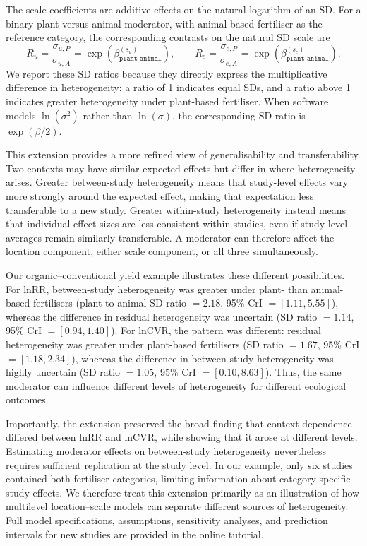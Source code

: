\begin{tcolorbox}[
  breakable,
  enhanced,
  colback=white,
  colframe=black,
  boxrule=0.7pt,
  arc=0pt,
  left=10pt,
  right=10pt,
  top=8pt,
  bottom=8pt,
  before skip=12pt,
  after skip=12pt
]
The scale coefficients are additive effects on the natural logarithm of an SD.
For a binary plant-versus-animal moderator, with animal-based fertiliser as the
reference category, the corresponding contrasts on the natural SD scale are
\[
  R_u=\frac{\sigma_{u,P}}{\sigma_{u,A}}
      =\exp\!\left(\beta_{\texttt{plant-animal}}^{(s_u)}\right),
  \qquad
  R_e=\frac{\sigma_{e,P}}{\sigma_{e,A}}
      =\exp\!\left(\beta_{\texttt{plant-animal}}^{(s_e)}\right).
\]
We report these SD ratios because they directly express the multiplicative
difference in heterogeneity: a ratio of 1 indicates equal SDs, and a ratio above
1 indicates greater heterogeneity under plant-based fertiliser. When software
models $\ln(\sigma^2)$ rather than $\ln(\sigma)$, the corresponding SD ratio is
$\exp(\beta/2)$.

This extension provides a more refined view of generalisability and
transferability. Two contexts may have similar expected effects but differ in
where heterogeneity arises. Greater between-study heterogeneity means that
study-level effects vary more strongly around the expected effect, making that
expectation less transferable to a new study. Greater within-study
heterogeneity instead means that individual effect sizes are less consistent
within studies, even if study-level averages remain similarly transferable. A
moderator can therefore affect the location component, either scale component,
or all three simultaneously.

Our organic--conventional yield example illustrates these different
possibilities. For lnRR, between-study heterogeneity was greater under plant-
than animal-based fertilisers (plant-to-animal SD ratio $=2.18$, 95\% CrI
$=[1.11, 5.55]$), whereas the difference in residual heterogeneity was
uncertain (SD ratio $=1.14$, 95\% CrI $=[0.94, 1.40]$). For lnCVR, the pattern
was different: residual heterogeneity was greater under plant-based fertilisers
(SD ratio $=1.67$, 95\% CrI $=[1.18, 2.34]$), whereas the difference in
between-study heterogeneity was highly uncertain (SD ratio $=1.05$, 95\% CrI
$=[0.10, 8.63]$). Thus, the same moderator can influence different levels of
heterogeneity for different ecological outcomes.

Importantly, the extension preserved the broad finding that context dependence
differed between lnRR and lnCVR, while showing that it arose at different
levels. Estimating moderator effects on between-study heterogeneity nevertheless
requires sufficient replication at the study level. In our example, only six
studies contained both fertiliser categories, limiting information about
category-specific study effects. We therefore treat this extension primarily
as an illustration of how multilevel location--scale models can separate
different sources of heterogeneity. Full model specifications, assumptions,
sensitivity analyses, and prediction intervals for new studies are provided in
the online tutorial.

\end{tcolorbox}

